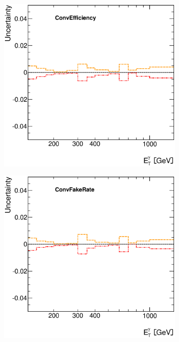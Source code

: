 \documentclass[12pt, twoside]{article}
\numberwithin{equation}{section}
\numberwithin{figure}{section}
\newenvironment{changemargin}[2]{%
\begin{list}{}{%
\setlength{\topsep}{0pt}%
\setlength{\leftmargin}{#1}%
\setlength{\rightmargin}{#2}%
\setlength{\listparindent}{\parindent}%
\setlength{\itemindent}{\parindent}%
\setlength{\parsep}{\parskip}%
}%
\item[]}{\end{list}}
\begin{document}
\vspace{0.5cm}
\begin{figure}[H]
    \checkoddpage
    \ifoddpage
        \begin{changemargin}{-1.0cm}{-0.75cm}
    \else
        \begin{changemargin}{-0.75cm}{-1.0cm}
    \fi
    \centering
        \begin{subfigure}[b]{0.27\textwidth}
            \includegraphics[width=\textwidth]{./images/PhotonSystematics/PhotonSystematic-1.eps}
        \end{subfigure}
        \begin{subfigure}[b]{0.27\textwidth}
            \includegraphics[width=\textwidth]{./images/PhotonSystematics/PhotonSystematic-2.eps}

\end{subfigure}
\end{changemargin}
\end{changemargin}
\end{figure}
\end{document}
